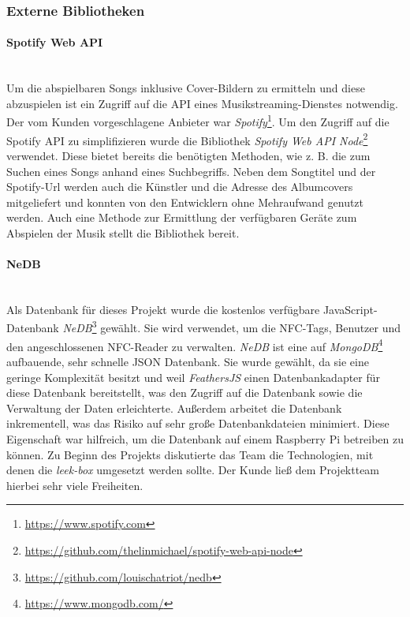 \documentclass[10pt, a4paper]{article}
\begin{document}
\subsubsection{Externe Bibliotheken}
\paragraph{Spotify Web API} $~$ \\
\label{SpotifyWebApiNode}
Um die abspielbaren Songs inklusive Cover-Bildern zu ermitteln und diese abzuspielen ist ein Zugriff auf die API eines Musikstreaming-Dienstes notwendig.
Der vom Kunden vorgeschlagene Anbieter war \textit{Spotify}\footnote{\url{https://www.spotify.com}}.
Um den Zugriff auf die Spotify API zu simplifizieren wurde die Bibliothek \textit{Spotify Web API Node}\footnote{\url{https://github.com/thelinmichael/spotify-web-api-node}} verwendet.
Diese bietet bereits die benötigten Methoden, wie z. B. die zum Suchen eines Songs anhand eines Suchbegriffs.
Neben dem Songtitel und der Spotify-Url werden auch die Künstler und die Adresse des Albumcovers mitgeliefert und konnten von den Entwicklern ohne Mehraufwand genutzt werden.
Auch eine Methode zur Ermittlung der verfügbaren Geräte zum Abspielen der Musik stellt die Bibliothek bereit.

\paragraph{NeDB} $~$ \\
Als Datenbank für dieses Projekt wurde die kostenlos verfügbare JavaScript-Datenbank \textit{NeDB}\footnote{\raggedright\url{https://github.com/louischatriot/nedb}} gewählt.
Sie wird verwendet, um die NFC-Tags, Benutzer und den angeschlossenen NFC-Reader zu verwalten.
\textit{NeDB} ist eine auf \textit{MongoDB}\footnote{\raggedright\url{https://www.mongodb.com/}} aufbauende, sehr schnelle JSON Datenbank.
Sie wurde gewählt, da sie eine geringe Komplexität besitzt und weil \textit{FeathersJS} einen Datenbankadapter für diese Datenbank bereitstellt, was den Zugriff auf die Datenbank sowie die Verwaltung der Daten erleichterte.
Außerdem arbeitet die Datenbank inkrementell, was das Risiko auf sehr große Datenbankdateien minimiert.
Diese Eigenschaft war hilfreich, um die Datenbank auf einem Raspberry Pi betreiben zu können.
Zu Beginn des Projekts diskutierte das Team die Technologien, mit denen die \textit{leek-box} umgesetzt werden sollte.
Der Kunde ließ dem Projektteam hierbei sehr viele Freiheiten.
\end{document}
